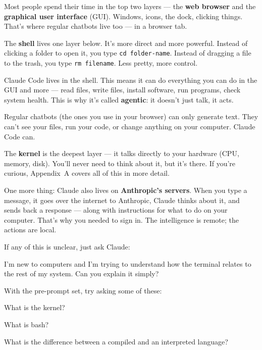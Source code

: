\documentclass[11pt,a4paper]{article}
\begin{document}
Most people spend their time in the top two layers --- the \textbf{web browser} and the \textbf{graphical user interface} (GUI). Windows, icons, the dock, clicking things. That's where regular chatbots live too --- in a browser tab.

The \textbf{shell} lives one layer below. It's more direct and more powerful. Instead of clicking a folder to open it, you type \texttt{cd folder-name}. Instead of dragging a file to the trash, you type \texttt{rm filename}. Less pretty, more control.

Claude Code lives in the shell. This means it can do everything you can do in the GUI and more --- read files, write files, install software, run programs, check system health. This is why it's called \textbf{agentic}: it doesn't just talk, it acts.

Regular chatbots (the ones you use in your browser) can only generate text. They can't see your files, run your code, or change anything on your computer. Claude Code can.

The \textbf{kernel} is the deepest layer --- it talks directly to your hardware (CPU, memory, disk). You'll never need to think about it, but it's there. If you're curious, Appendix~A covers all of this in more detail.

One more thing: Claude also lives on \textbf{Anthropic's servers}. When you type a message, it goes over the internet to Anthropic, Claude thinks about it, and sends back a response --- along with instructions for what to do on your computer. That's why you needed to sign in. The intelligence is remote; the actions are local.

If any of this is unclear, just ask Claude:

\begin{tcolorbox}[promptbox]
I'm new to computers and I'm trying to understand how the terminal relates to the rest of my system. Can you explain it simply?
\end{tcolorbox}

With the pre-prompt set, try asking some of these:

\begin{tcolorbox}[promptbox]
What is the kernel?
\end{tcolorbox}

\begin{tcolorbox}[promptbox]
What is bash?
\end{tcolorbox}

\begin{tcolorbox}[promptbox]
What is the difference between a compiled and an interpreted language?
\end{tcolorbox}
\end{document}
